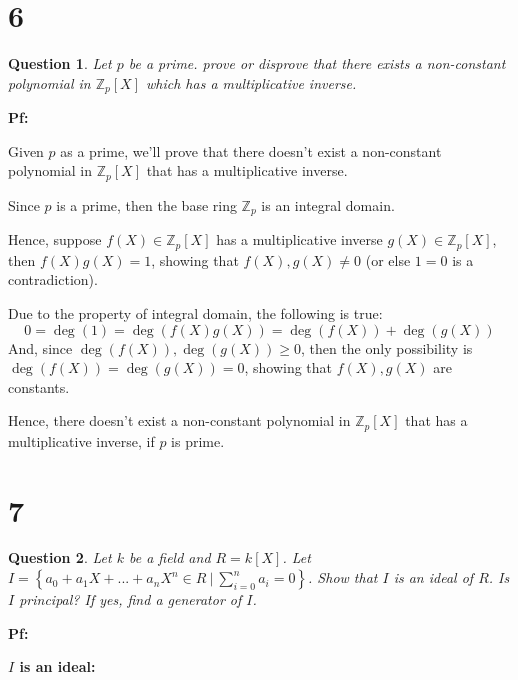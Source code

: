 \documentclass{article}
\newtheorem{question}{Question}
\begin{document}
\hfill

\hfill

\section*{6}
\begin{myBox}[]{}
    \begin{question}
        Let $p$ be a prime. prove or disprove that there exists a non-constant polynomial in
        $\mathbb{Z}_p[X]$ which has a multiplicative inverse.
    \end{question}
\end{myBox}

\textbf{Pf:}

Given $p$ as a prime, we'll prove that there doesn't exist a non-constant polynomial in $\mathbb{Z}_p[X]$ that has a multiplicative inverse.

\hfill

Since $p$ is a prime, then the base ring $\mathbb{Z}_p$ is an integral domain. 

Hence, suppose $f(X)\in\mathbb{Z}_p[X]$ has a multiplicative inverse $g(X)\in\mathbb{Z}_p[X]$, then $f(X)g(X)=1$,
showing that $f(X),g(X)\neq 0$ (or else $1=0$ is a contradiction).

\hfill

Due to the property of integral domain, the following is true:
$$0=\deg(1)=\deg(f(X)g(X))=\deg(f(X))+\deg(g(X))$$
And, since $\deg(f(X)),\deg(g(X))\geq 0$, then the only possibility is $\deg(f(X))=\deg(g(X))=0$,
showing that $f(X),g(X)$ are constants.

Hence, there doesn't exist a non-constant polynomial in $\mathbb{Z}_p[X]$ that has a multiplicative inverse,
if $p$ is prime.

\break

\section*{7}
\begin{myBox}[]{}
    \begin{question}
        Let $k$ be a field and $R=k[X]$. Let $I=\left\{a_0+a_1X+...+a_nX^n\in R\ |\ \sum_{i=0}^{n}a_i=0\right\}$.
        Show that $I$ is an ideal of $R$. Is $I$ principal? If yes, find a generator of $I$.
    \end{question}
\end{myBox}

\textbf{Pf:}

\textbf{$I$ is an ideal:}
\end{document}
